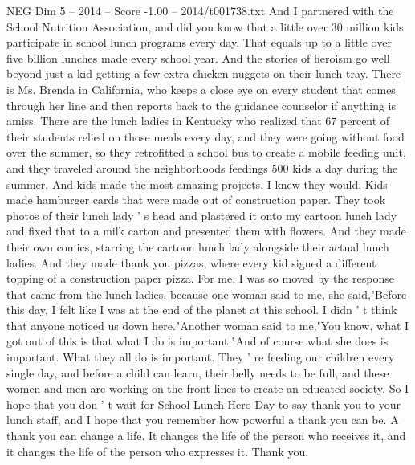 \begin{textsample}{NEG Dim 5 – 2014 – Score -1.00 – 2014/t001738.txt}
And I partnered with the School Nutrition Association, and did you know that a little over 30 million kids participate in school lunch programs every day.
That equals up to a little over five billion lunches made every school year.
And the stories of heroism go well beyond just a kid getting a few extra chicken nuggets on their lunch tray.
There is Ms.
Brenda in California, who keeps a close eye on every student that comes through her line and then reports back to the guidance counselor if anything is amiss.
There are the lunch ladies in Kentucky who realized that 67 percent of their students relied on those meals every day, and they were going without food over the summer, so they retrofitted a school bus to create a mobile feeding unit, and they traveled around the neighborhoods feedings 500 kids a day during the summer.
And kids made the most amazing projects.
I knew they would.
Kids made hamburger cards that were made out of construction paper.
They took photos of their lunch lady ' s head and plastered it onto my cartoon lunch lady and fixed that to a milk carton and presented them with flowers.
And they made their own comics, starring the cartoon lunch lady alongside their actual lunch ladies.
And they made thank you pizzas, where every kid signed a different topping of a construction paper pizza.
For me, I was so moved by the response that came from the lunch ladies, because one woman said to me, she said,"Before this day, I felt like I was at the end of the planet at this school.
I didn ' t think that anyone noticed us down here."Another woman said to me,"You know, what I got out of this is that what I do is important."And of course what she does is important.
What they all do is important.
They ' re feeding our children every single day, and before a child can learn, their belly needs to be full, and these women and men are working on the front lines to create an educated society.
So I hope that you don ' t wait for School Lunch Hero Day to say thank you to your lunch staff, and I hope that you remember how powerful a thank you can be.
A thank you can change a life.
It changes the life of the person who receives it, and it changes the life of the person who expresses it.
Thank you.

\end{textsample}
